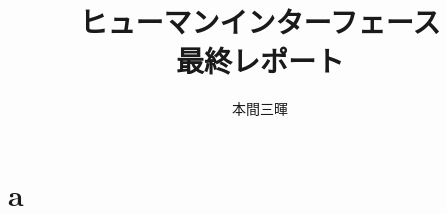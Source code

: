 \documentclass[titlepage,a4paper]{jsarticle}
\title{ヒューマンインターフェース\\最終レポート}
\author{本間三暉}
\begin{document}
\maketitle
\section{a}


\begin{thebibliography}{99}
  \bibitem{}
\end{thebibliography}
\end{document}
